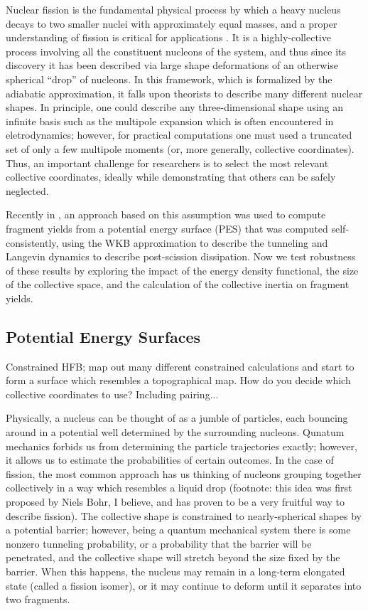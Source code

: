 Nuclear fission is the fundamental physical process by which a heavy nucleus decays to two smaller nuclei with approximately equal masses, and a proper understanding of fission is critical for applications . It is a highly-collective process involving all the constituent nucleons of the system, and thus since its discovery it has been described via large shape deformations of an otherwise spherical ``drop'' of nucleons. In this framework, which is formalized by the adiabatic approximation, it falls upon theorists to describe many different nuclear shapes. In principle, one could describe any three-dimensional shape using an infinite basis such as the multipole expansion which is often encountered in eletrodynamics; however, for practical computations one must used a truncated set of only a few multipole moments (or, more generally, collective coordinates). Thus, an important challenge for researchers is to select the most relevant collective coordinates, ideally while demonstrating that others can be safely neglected.

Recently in \cite{Sadhukhan2016}, an approach based on this assumption was used to compute fragment yields from a potential energy surface (PES) that was computed self-consistently, using the WKB approximation to describe the tunneling and Langevin dynamics to describe post-scission dissipation. Now we test robustness of these results by exploring the impact of the energy density functional, the size of the collective space, and the calculation of the collective inertia on fragment yields.

\subsection{Potential Energy Surfaces}
Constrained HFB; map out many different constrained calculations and start to form a surface which resembles a topographical map. How do you decide which collective coordinates to use? Including pairing...

Physically, a nucleus can be thought of as a jumble of particles, each bouncing around in a potential well determined by the surrounding nucleons. Qunatum mechanics forbids us from determining the particle trajectories exactly; however, it allows us to estimate the probabilities of certain outcomes. In the case of fission, the most common approach has us thinking of nucleons grouping together collectively in a way which resembles a liquid drop (footnote: this idea was first proposed by Niels Bohr, I believe, and has proven to be a very fruitful way to describe fission). The collective shape is constrained to nearly-spherical shapes by a potential barrier; however, being a quantum mechanical system there is some nonzero tunneling probability, or a probability that the barrier will be penetrated, and the collective shape will stretch beyond the size fixed by the barrier. When this happens, the nucleus may remain in a long-term elongated state (called a fission isomer), or it may continue to deform until it separates into two fragments.

